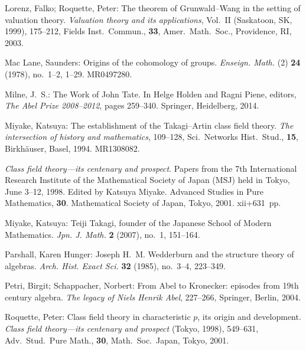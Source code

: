 \noindent Lorenz, Falko; Roquette, Peter: The theorem of Grunwald--Wang in the setting of valuation theory. \emph{Valuation theory and its applications}, Vol.~II (Saskatoon, SK, 1999), 175--212, Fields Inst.~Commun., \textbf{33}, Amer.~Math.~Soc., Providence, RI, 2003.\par\medskip

\noindent Mac Lane, Saunders: Origins of the cohomology of groups. \emph{Enseign. Math.} (2) \textbf{24} (1978), no.~1--2, 1--29. MR0497280.\par\medskip

\noindent Milne, J.~S.: The Work of John Tate. In Helge Holden and Ragni Piene, editors, \emph{The Abel Prize 2008--2012}, pages 259--340. Springer, Heidelberg, 2014.\par\medskip

\noindent Miyake, Katsuya: The establishment of the Takagi--Artin class field theory. \emph{The intersection of history and mathematics}, 109--128, Sci.~Networks Hist.~Stud., \textbf{15}, Birkh\"auser, Basel, 1994. MR1308082.\par\medskip

\noindent \emph{Class field theory---its centenary and prospect}. Papers from the 7th International Research Institute of the Mathematical Society of Japan (MSJ) held in Tokyo, June 3--12, 1998. Edited by Katsuya Miyake. Advanced Studies in Pure Mathematics, \textbf{30}. Mathematical Society of Japan, Tokyo, 2001. xii+631~pp.\par\medskip

\noindent Miyake, Katsuya: Teiji Takagi, founder of the Japanese School of Modern Mathematics. \emph{Jpn. J. Math.} \textbf{2} (2007), no.~1, 151--164.\par\medskip

\noindent Parshall, Karen Hunger: Joseph H.~M. Wedderburn and the structure theory of algebras. \emph{Arch. Hist. Exact Sci.} \textbf{32} (1985), no.~3--4, 223--349.\par\medskip

\noindent Petri, Birgit; Schappacher, Norbert: From Abel to Kronecker: episodes from 19th century algebra. \emph{The legacy of Niels Henrik Abel}, 227--266, Springer, Berlin, 2004.\par\medskip

\noindent Roquette, Peter: Class field theory in characteristic $p$, its origin and development. \emph{Class field theory---its centenary and prospect} (Tokyo, 1998), 549--631, Adv.~Stud.~Pure Math., \textbf{30}, Math.~Soc.~Japan, Tokyo, 2001.\par\medskip

